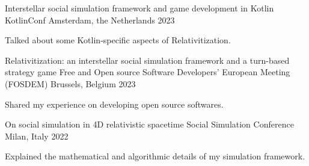 

\begin{cventries}

  \cventry
    {Interstellar social simulation framework and game development in Kotlin} %
    {KotlinConf} %
    {Amsterdam, the Netherlands} %
    {2023} %
    {
      \begin{cvitems} %
        \item {Talked about some Kotlin-specific aspects of Relativitization.}
      \end{cvitems}
    }


  \cventry
    {Relativitization: an interstellar social simulation framework and a turn-based strategy game} %
    {Free and Open source Software Developers' European Meeting (FOSDEM)} %
    {Brussels, Belgium} %
    {2023} %
    {
      \begin{cvitems} %
        \item {Shared my experience on developing open source softwares.}
      \end{cvitems}
    }

  \cventry
    {On social simulation in 4D relativistic spacetime} %
    {Social Simulation Conference} %
    {Milan, Italy} %
    {2022} %
    {
      \begin{cvitems} %
        \item {Explained the mathematical and algorithmic details of my simulation framework.}
      \end{cvitems}
    }


\end{cventries}

